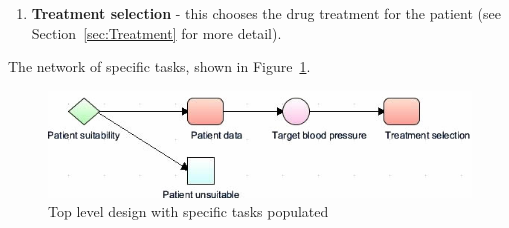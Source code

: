 \documentclass[11pt]{article}
\begin{document}
\begin{enumerate}
\item \textbf{Treatment selection} - this chooses the drug treatment for the patient (see Section~\ref{sec:Treatment} for more detail).
\end{enumerate}

The network of specific tasks, shown in Figure~\ref{fig:tallis_task_top}.

\begin{figure}[ht]
\begin{center}
\includegraphics[scale=0.8]{tallis_task_top}
\caption{Top level design with specific tasks populated}
\label{fig:tallis_task_top}
\end{center}
\end{figure}
\end{document}
